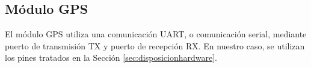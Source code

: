 
%
	
	
	
	




\subsection{Módulo GPS}
\label{subsec:configgps}

El módulo \acs{GPS} utiliza una comunicación \acs{UART}, o comunicación serial, mediante puerto de transmisión TX y puerto de recepción RX. En nuestro caso, se utilizan los pines tratados en la Sección \ref{sec:disposicionhardware}.




